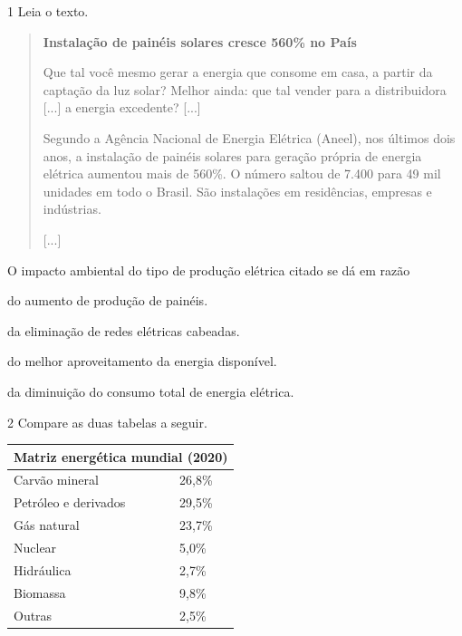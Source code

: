 \num{1} Leia o texto.

\begin{quote}
\textbf{Instalação de painéis solares cresce 560\% no País}

Que tal você mesmo gerar a energia que consome em casa, a
partir da captação da luz solar? Melhor ainda: que tal vender para a
distribuidora {[}...{]} a energia excedente? {[}...{]}

Segundo a Agência Nacional de Energia Elétrica (Aneel), nos
últimos dois anos, a instalação de painéis solares para geração própria
de energia elétrica aumentou mais de 560\%. O número saltou de 7.400
para 49 mil unidades em todo o Brasil. São instalações em residências,
empresas e indústrias.

{[}...{]}

\end{quote}

O impacto ambiental do tipo de produção elétrica citado se dá em razão

\begin{escolha}
\item
  do aumento de produção de painéis.
\item
  da eliminação de redes elétricas cabeadas.
\item
  do melhor aproveitamento da energia disponível.
\item
  da diminuição do consumo total de energia elétrica.
\end{escolha}


\num{2} Compare as duas tabelas a seguir.

\begin{center}
\begin{tabular}{ll}
\hline
\multicolumn{2}{l}{\textbf{Matriz energética mundial (2020)}} \\ \hline
\multicolumn{1}{l|}{Carvão mineral} & 26,8\% \\ \hline
\multicolumn{1}{l|}{Petróleo e derivados} & 29,5\% \\ \hline
\multicolumn{1}{l|}{Gás natural} & 23,7\% \\ \hline
\multicolumn{1}{l|}{Nuclear} & 5,0\% \\ \hline
\multicolumn{1}{l|}{Hidráulica} & 2,7\% \\ \hline
\multicolumn{1}{l|}{Biomassa} & 9,8\% \\ \hline
\multicolumn{1}{l|}{Outras} & 2,5\% \\ \hline
\end{tabular}
\end{center}

